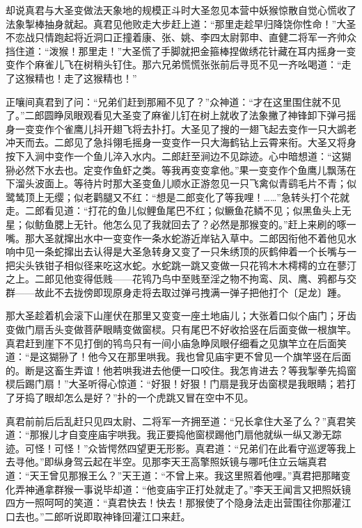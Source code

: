 \documentclass[12pt,UTF8]{ctexbook}
\begin{document}
{却说真君与大圣变做法天象地的规模正斗时大圣忽见本营中妖猴惊散自觉心慌收了法象掣棒抽身就起。真君见他败走大步赶上道：“那里走趁早归降饶你性命！”大圣不恋战只情跑起将近洞口正撞着康、张、姚、李四太尉郭申、直健二将军一齐帅众挡住道：“泼猴！那里走！”大圣慌了手脚就把金箍棒捏做绣花针藏在耳内摇身一变变作个麻雀儿飞在树稍头钉住。那六兄弟慌慌张张前后寻觅不见一齐吆喝道：“走了这猴精也！走了这猴精也！”

正嚷间真君到了问：“兄弟们赶到那厢不见了？”众神道：“才在这里围住就不见了。”二郎圆睁凤眼观看见大圣变了麻雀儿钉在树上就收了法象撇了神锋卸下弹弓摇身一变变作个雀鹰儿抖开翅飞将去扑打。大圣见了搜的一翅飞起去变作一只大鹚老冲天而去。二郎见了急抖翎毛摇身一变变作一只大海鹤钻上云霄来衔。大圣又将身按下入涧中变作一个鱼儿淬入水内。二郎赶至涧边不见踪迹。心中暗想道：“这猢狲必然下水去也。定变作鱼虾之类。等我再变变拿他。”果一变变作个鱼鹰儿飘荡在下溜头波面上。等待片时那大圣变鱼儿顺水正游忽见一只飞禽似青鹞毛片不青；似鹭鸶顶上无缨；似老鹳腿又不红：“想是二郎变化了等我哩！……”急转头打个花就走。二郎看见道：“打花的鱼儿似鲤鱼尾巴不红；似鳜鱼花鳞不见；似黑鱼头上无星；似鲂鱼腮上无针。他怎么见了我就回去了？必然是那猴变的。”赶上来刷的啄一嘴。那大圣就撺出水中一变变作一条水蛇游近岸钻入草中。二郎因衔他不着他见水响中见一条蛇撺出去认得是大圣急转身又变了一只朱绣顶的灰鹤伸着一个长嘴与一把尖头铁钳子相似径来吃这水蛇。水蛇跳一跳又变做一只花鸨木木樗樗的立在蓼汀之上。二郎见他变得低贱——花鸨乃鸟中至贱至淫之物不拘鸾、凤、鹰、鸦都与交群——故此不去拢傍即现原身走将去取过弹弓拽满一弹子把他打个〔足龙〕踵。

那大圣趁着机会滚下山崖伏在那里又变变一座土地庙儿；大张着口似个庙门；牙齿变做门扇舌头变做菩萨眼睛变做窗棂。只有尾巴不好收拾竖在后面变做一根旗竿。真君赶到崖下不见打倒的鸨鸟只有一间小庙急睁凤眼仔细看之见旗竿立在后面笑道：“是这猢狲了！他今又在那里哄我。我也曾见庙宇更不曾见一个旗竿竖在后面的。断是这畜生弄谊！他若哄我进去他便一口咬住。我怎肯进去？等我掣拳先捣窗棂后踢门扇！”大圣听得心惊道：“好狠！好狠！门扇是我牙齿窗棂是我眼睛；若打了牙捣了眼却怎么是好？”扑的一个虎跳又冒在空中不见。

真君前前后后乱赶只见四太尉、二将军一齐拥至道：“兄长拿住大圣了么？”真君笑道：“那猴儿才自变座庙宇哄我。我正要捣他窗棂踢他门扇他就纵一纵又渺无踪迹。可怪！可怪！”众皆愕然四望更无形影。真君道：“兄弟们在此看守巡逻等我上去寻他。”即纵身驾云起在半空。见那李天王高擎照妖镜与哪吒住立云端真君道：“天王曾见那猴王么？”天王道：“不曾上来。我这里照着他哩。”真君把那睹变化弄神通拿群猴一事说毕却道：“他变庙宇正打处就走了。”李天王闻言又把照妖镜四方一照呵呵的笑道：“真君快去！快去！那猴使了个隐身法走出营围往你那灌江口去也。”二郎听说即取神锋回灌江口来赶。

}
\end{document}
